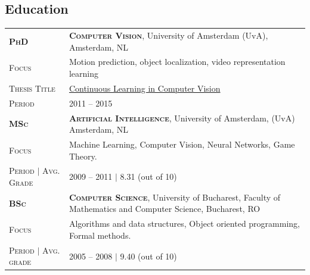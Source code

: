 \documentclass[a4paper, oneside, final]{scrartcl}
\newcommand{\gray}{\rowcolor[gray]{.90}}
\begin{document}
\begin{center}
		\section{Education}
        \begin{tabular}{p{3.5cm}@{\hskip 0.3in}p{12.3cm}}
			\gray \textsc{\textbf{PhD}}     & \textbf{\textsc{Computer Vision}}, University of Amsterdam (UvA), Amsterdam, NL\\
			\textsc{Focus}                  & Motion prediction, object localization, video representation learning \\
			\textsc{Thesis Title}           & {\href{http://dare.uva.nl/search?identifier=90ad88f5-c16e-4450-86f2-23faa250fcab}{Continuous Learning in Computer Vision}}\\
            \textsc{Period}                 & \textsc{2011 -- 2015}
            \vspace{5px}\\
			\gray \textsc{\textbf{MSc}}         & \textbf{\textsc{Artificial Intelligence}}, University of Amsterdam, (UvA) Amsterdam, NL\\
			\textsc{Focus}                      & Machine Learning, Computer Vision, Neural Networks, Game Theory.\\
            \textsc{Period} $\mid$ \textsc{Avg. Grade}   & \textsc{2009  -- 2011} $|$ 8.31 (out of 10)
            \vspace{5px}\\
			\gray \textsc{\textbf{BSc}}         & \textbf{\textsc{Computer Science}}, University of Bucharest, Faculty of Mathematics and Computer Science, Bucharest, RO\\
			\textsc{Focus}                      & Algorithms and data structures, Object oriented programming, Formal methods.\\ 
            \textsc{Period} $\mid$ \textsc{Avg. grade}   & \textsc{2005 -- 2008} $|$ 9.40 (out of 10)
		\end{tabular}

\end{center}
\end{document}
